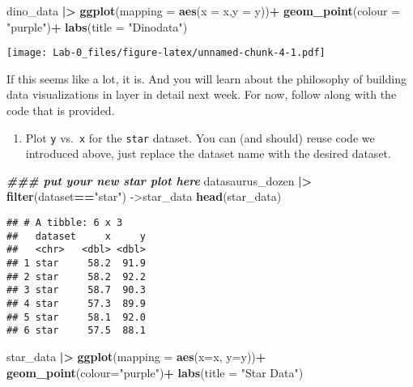 \documentclass[
]{article}
\newenvironment{Shaded}{\begin{snugshade}}{\end{snugshade}}
\newcommand{\AttributeTok}[1]{\textcolor[rgb]{0.13,0.29,0.53}{#1}}
\newcommand{\DocumentationTok}[1]{\textcolor[rgb]{0.56,0.35,0.01}{\textbf{\textit{#1}}}}
\newcommand{\FunctionTok}[1]{\textcolor[rgb]{0.13,0.29,0.53}{\textbf{#1}}}
\newcommand{\NormalTok}[1]{#1}
\newcommand{\OtherTok}[1]{\textcolor[rgb]{0.56,0.35,0.01}{#1}}
\newcommand{\SpecialCharTok}[1]{\textcolor[rgb]{0.81,0.36,0.00}{\textbf{#1}}}
\newcommand{\StringTok}[1]{\textcolor[rgb]{0.31,0.60,0.02}{#1}}
\providecommand{\tightlist}{%
  \setlength{\itemsep}{0pt}\setlength{\parskip}{0pt}}
\begin{document}
\begin{Shaded}
\begin{Highlighting}[]
\NormalTok{dino\_data }\SpecialCharTok{|\textgreater{}} 
  \FunctionTok{ggplot}\NormalTok{(}\AttributeTok{mapping =} \FunctionTok{aes}\NormalTok{(}\AttributeTok{x =}\NormalTok{ x,}\AttributeTok{y =}\NormalTok{ y))}\SpecialCharTok{+}
  \FunctionTok{geom\_point}\NormalTok{(}\AttributeTok{colour =} \StringTok{"purple"}\NormalTok{)}\SpecialCharTok{+}
  \FunctionTok{labs}\NormalTok{(}\AttributeTok{title =} \StringTok{"Dinodata"}\NormalTok{)}
\end{Highlighting}
\end{Shaded}

\texttt{[image: Lab-0\_files/figure-latex/unnamed-chunk-4-1.pdf]}

If this seems like a lot, it is. And you will learn about the philosophy
of building data visualizations in layer in detail next week. For now,
follow along with the code that is provided.

\begin{enumerate}
\def\labelenumi{\arabic{enumi}.}
\setcounter{enumi}{1}
\tightlist
\item
  Plot \texttt{y} vs.~\texttt{x} for the \texttt{star} dataset. You can
  (and should) reuse code we introduced above, just replace the dataset
  name with the desired dataset.
\end{enumerate}

\begin{Shaded}
\begin{Highlighting}[]
\DocumentationTok{\#\#\# put your new star plot here}
\NormalTok{datasaurus\_dozen }\SpecialCharTok{|\textgreater{}} 
  \FunctionTok{filter}\NormalTok{(dataset}\SpecialCharTok{==}\StringTok{"star"}\NormalTok{) }\OtherTok{{-}\textgreater{}}\NormalTok{star\_data}
\FunctionTok{head}\NormalTok{(star\_data)}
\end{Highlighting}
\end{Shaded}

\begin{verbatim}
## # A tibble: 6 x 3
##   dataset     x     y
##   <chr>   <dbl> <dbl>
## 1 star     58.2  91.9
## 2 star     58.2  92.2
## 3 star     58.7  90.3
## 4 star     57.3  89.9
## 5 star     58.1  92.0
## 6 star     57.5  88.1
\end{verbatim}

\begin{Shaded}
\begin{Highlighting}[]
\NormalTok{star\_data }\SpecialCharTok{|\textgreater{}} 
  \FunctionTok{ggplot}\NormalTok{(}\AttributeTok{mapping =} \FunctionTok{aes}\NormalTok{(}\AttributeTok{x=}\NormalTok{x, }\AttributeTok{y=}\NormalTok{y))}\SpecialCharTok{+}
  \FunctionTok{geom\_point}\NormalTok{(}\AttributeTok{colour=}\StringTok{"purple"}\NormalTok{)}\SpecialCharTok{+}
  \FunctionTok{labs}\NormalTok{(}\AttributeTok{title =} \StringTok{"Star Data"}\NormalTok{)}
\end{Highlighting}
\end{Shaded}
\end{document}

